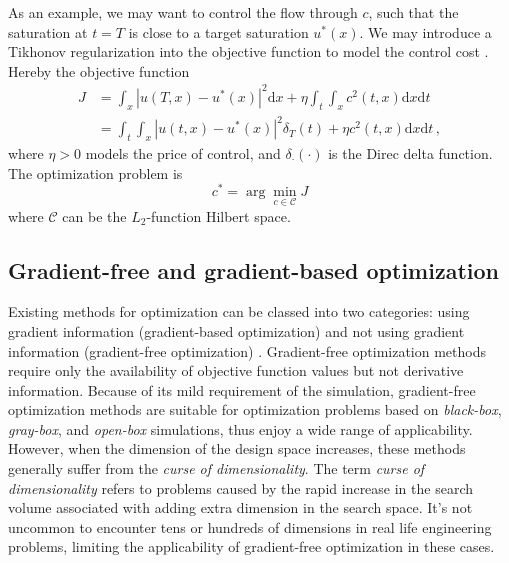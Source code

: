 \documentclass[a4paper,onecolumn]{article}
\theoremstyle{remark}
\begin{document}
\noindent As an example, we may
want to control the flow through $c$, such that the saturation at $t=T$ is close to 
a target saturation $u^*(x)$. We may introduce a Tikhonov regularization into the objective function 
to model the control cost \cite{Boyd optimization}.
Hereby the objective function
\begin{equation}\begin{split}
    J &= \int_x \left|u(T,x) - u^*(x)\right|^2 \textrm{d}x + \eta \int_t\int_x  c^2(t,x) \textrm{d}x\textrm{d}t\\
      &= \int_t \int_x \left|u(t,x) - u^*(x)\right|^2 \delta_T(t) + \eta c^2(t,x) \textrm{d}x \textrm{d}t \,,
\end{split}\end{equation}
where $\eta>0$ models the price of control, and $\delta_\cdot(\cdot)$ is the Direc delta function.
The optimization problem is
\begin{equation}
    c^* = \arg\min_{c\in \mathcal{C}} J
\end{equation}
where $\mathcal{C}$ can be the $L_2$-function Hilbert space.\\

\subsection{Gradient-free and gradient-based optimization}
\label{gradfree_gradbased}
\noindent Existing methods for optimization can be classed into two categories: 
using gradient information (gradient-based optimization) and not using gradient information (gradient-free optimization)
\cite{hanmaster, Opt Koziel Book}.
Gradient-free optimization methods require only the availability of objective function values but
not derivative information\cite{gradfreereview}. Because of its mild requirement of the simulation, 
gradient-free optimization methods are suitable for optimization problems based
on \textit{black-box}, \textit{gray-box}, and \textit{open-box} simulations, 
thus enjoy a wide range of applicability. However, when the dimension of the design space 
increases, these methods generally suffer from the \textit{curse of dimensionality}.
The term \textit{curse of dimensionality} refers to problems caused by the rapid increase in the search volume associated
with adding extra dimension in the search space\cite{dynamicprogramming}. It's not uncommon to encounter
tens or hundreds of dimensions in real life engineering problems, 
limiting the applicability of gradient-free optimization
in these cases.\\
\end{document}
